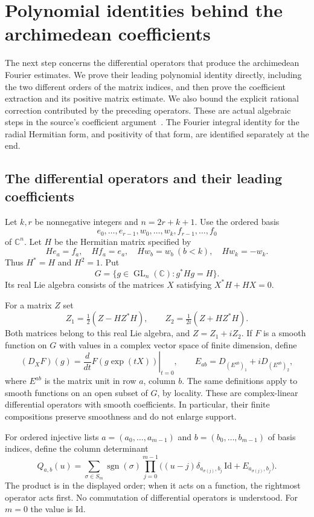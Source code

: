 \section{Polynomial identities behind the archimedean coefficients}
\label{ca-section}

The next step concerns the differential operators that produce
the archimedean Fourier estimates.  We prove their leading
polynomial identity directly, including the two different orders
of the matrix indices, and then prove the coefficient extraction
and its positive matrix estimate.  We also bound the explicit
rational correction contributed by the preceding operators.
These are actual algebraic steps in the source's coefficient
argument~\cite{alpo-uniform-source}.  The Fourier integral
identity for the radial Hermitian form, and positivity of that
form, are identified separately at the end.

\subsection{The differential operators and their leading coefficients}

Let $k,r$ be nonnegative integers and $n=2r+k+1$.
Use the ordered basis
\[
 e_0,\ldots,e_{r-1},w_0,\ldots,w_k,f_{r-1},\ldots,f_0
\]
of $\mathbb C^n$.  Let $H$ be the Hermitian matrix specified by
\[
 He_a=f_a,\quad Hf_a=e_a,\quad Hw_b=w_b\ (b<k),
 \quad Hw_k=-w_k.
\]
Thus $H^*=H$ and $H^2=1$.  Put
\[
 G=\{g\in\operatorname{GL}_n(\mathbb C):g^*Hg=H\}.
\]
Its real Lie algebra consists of the matrices $X$ satisfying
$X^*H+HX=0$.

For a matrix $Z$ set
\[
 Z_1=\tfrac12(Z-HZ^*H),\qquad
 Z_2=\tfrac1{2i}(Z+HZ^*H).
\]
Both matrices belong to this real Lie algebra, and
$Z=Z_1+iZ_2$.  If $F$ is a smooth function on $G$ with
values in a complex vector space of finite dimension, define
\[
 (D_XF)(g)=\left.\frac{d}{dt}F(g\exp(tX))\right|_{t=0},
 \qquad E_{ab}=D_{(E^{ab})_1}+iD_{(E^{ab})_2},
\]
where $E^{ab}$ is the matrix unit in row $a$, column $b$.
The same definitions apply to smooth functions on an open subset
of $G$, by locality.  These are complex-linear differential
operators with smooth coefficients.  In particular, their
finite compositions preserve smoothness and do not enlarge
support.

For ordered injective lists $a=(a_0,\ldots,a_{m-1})$ and
$b=(b_0,\ldots,b_{m-1})$ of basis indices, define the column
determinant
\begin{equation}\label{ca-column}
 Q_{a,b}(u)=
 \sum_{\sigma\in S_m}\operatorname{sgn}(\sigma)
 \prod_{j=0}^{m-1}
 \bigl((u-j)\delta_{a_{\sigma(j)},b_j}\,\mathrm{Id}
                                  +E_{a_{\sigma(j)},b_j}\bigr).
\end{equation}
The product is in the displayed order; when it acts on a
function, the rightmost operator acts first.  No commutation
of differential operators is understood.
For $m=0$ the value is $\mathrm{Id}$.

